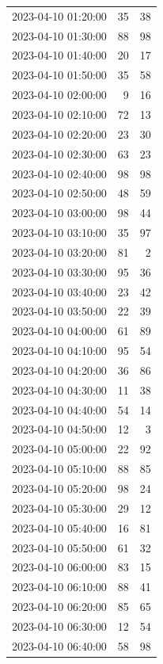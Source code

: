 \documentclass[
  letterpaper,
  DIV=11,
  numbers=noendperiod]{scrartcl}
\begin{document}
\begin{tabular}{lrr}
2023-04-10 01:20:00 &    35 &    38 \\
2023-04-10 01:30:00 &    88 &    98 \\
2023-04-10 01:40:00 &    20 &    17 \\
2023-04-10 01:50:00 &    35 &    58 \\
2023-04-10 02:00:00 &     9 &    16 \\
2023-04-10 02:10:00 &    72 &    13 \\
2023-04-10 02:20:00 &    23 &    30 \\
2023-04-10 02:30:00 &    63 &    23 \\
2023-04-10 02:40:00 &    98 &    98 \\
2023-04-10 02:50:00 &    48 &    59 \\
2023-04-10 03:00:00 &    98 &    44 \\
2023-04-10 03:10:00 &    35 &    97 \\
2023-04-10 03:20:00 &    81 &     2 \\
2023-04-10 03:30:00 &    95 &    36 \\
2023-04-10 03:40:00 &    23 &    42 \\
2023-04-10 03:50:00 &    22 &    39 \\
2023-04-10 04:00:00 &    61 &    89 \\
2023-04-10 04:10:00 &    95 &    54 \\
2023-04-10 04:20:00 &    36 &    86 \\
2023-04-10 04:30:00 &    11 &    38 \\
2023-04-10 04:40:00 &    54 &    14 \\
2023-04-10 04:50:00 &    12 &     3 \\
2023-04-10 05:00:00 &    22 &    92 \\
2023-04-10 05:10:00 &    88 &    85 \\
2023-04-10 05:20:00 &    98 &    24 \\
2023-04-10 05:30:00 &    29 &    12 \\
2023-04-10 05:40:00 &    16 &    81 \\
2023-04-10 05:50:00 &    61 &    32 \\
2023-04-10 06:00:00 &    83 &    15 \\
2023-04-10 06:10:00 &    88 &    41 \\
2023-04-10 06:20:00 &    85 &    65 \\
2023-04-10 06:30:00 &    12 &    54 \\
2023-04-10 06:40:00 &    58 &    98 \\

\end{tabular}
\end{document}
